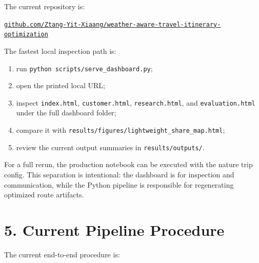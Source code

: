 \documentclass[11pt,a4paper]{article}
\begin{document}
\noindent The current repository is:

\begin{center}
\href{https://github.com/Ztang-Yit-Xiaang/weather-aware-travel-itinerary-optimization}{\texttt{github.com/Ztang-Yit-Xiaang/weather-aware-travel-itinerary-optimization}}
\end{center}

\noindent The fastest local inspection path is:

\begin{enumerate}
    \item run \texttt{python scripts/serve\_dashboard.py};
    \item open the printed local URL;
    \item inspect \texttt{index.html}, \texttt{customer.html}, \texttt{research.html}, and \texttt{evaluation.html} under the full dashboard folder;
    \item compare it with \texttt{results/figures/lightweight\_share\_map.html};
    \item review the current output summaries in \texttt{results/outputs/}.
\end{enumerate}

\noindent For a full rerun, the production notebook can be executed with the nature trip config. This separation is intentional: the dashboard is for inspection and communication, while the Python pipeline is responsible for regenerating optimized route artifacts.

\section*{5. Current Pipeline Procedure}

\noindent The current end-to-end procedure is:
\end{document}
